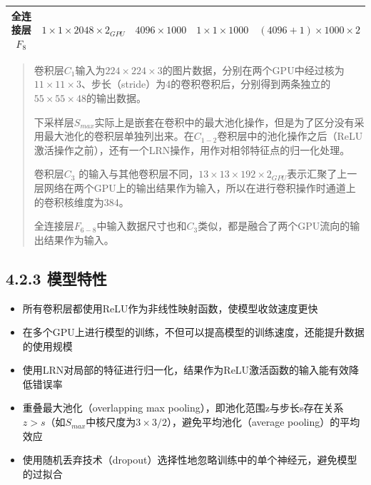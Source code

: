 \begin{longtable}[]{ccccc}
\begin{minipage}[t]{0.11\columnwidth}
全连接层\(F_8\)\strut
\end{minipage} & \begin{minipage}[t]{0.18\columnwidth}\centering\strut
\(1\times1\times2048\times2_{GPU}\)\strut
\end{minipage} & \begin{minipage}[t]{0.20\columnwidth}\centering\strut
\(4096\times1000\)\strut
\end{minipage} & \begin{minipage}[t]{0.18\columnwidth}\centering\strut
\(1\times1\times1000\)\strut
\end{minipage} & \begin{minipage}[t]{0.19\columnwidth}\centering\strut
\((4096+1)\times1000\times2\)\strut
\end{minipage}\tabularnewline
\bottomrule
\end{longtable}

\begin{quote}
卷积层\(C_1\)输入为\(224\times224\times3\)的图片数据，分别在两个GPU中经过核为\(11\times11\times3\)、步长（stride）为4的卷积卷积后，分别得到两条独立的\(55\times55\times48\)的输出数据。

下采样层\(S_{max}\)实际上是嵌套在卷积中的最大池化操作，但是为了区分没有采用最大池化的卷积层单独列出来。在\(C_{1-2}\)卷积层中的池化操作之后（ReLU激活操作之前），还有一个LRN操作，用作对相邻特征点的归一化处理。

卷积层\(C_3\)
的输入与其他卷积层不同，\(13\times13\times192\times2_{GPU}\)表示汇聚了上一层网络在两个GPU上的输出结果作为输入，所以在进行卷积操作时通道上的卷积核维度为384。

全连接层\(F_{6-8}\)中输入数据尺寸也和\(C_3\)类似，都是融合了两个GPU流向的输出结果作为输入。
\end{quote}

\subsection{4.2.3 模型特性}\label{ux6a21ux578bux7279ux6027-1}

\begin{itemize}
\item
  所有卷积层都使用ReLU作为非线性映射函数，使模型收敛速度更快
\item
  在多个GPU上进行模型的训练，不但可以提高模型的训练速度，还能提升数据的使用规模
\item
  使用LRN对局部的特征进行归一化，结果作为ReLU激活函数的输入能有效降低错误率
\item
  重叠最大池化（overlapping max
  pooling），即池化范围z与步长s存在关系\(z>s\)（如\(S_{max}\)中核尺度为\(3\times3/2\)），避免平均池化（average
  pooling）的平均效应
\item
  使用随机丢弃技术（dropout）选择性地忽略训练中的单个神经元，避免模型的过拟合
\end{itemize}

